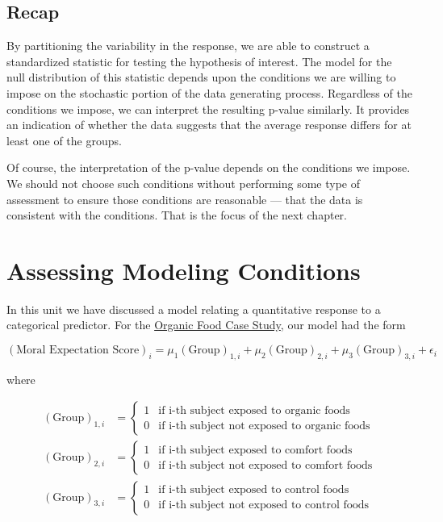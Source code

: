 \documentclass[
]{book}
\theoremstyle{plain}
\theoremstyle{mydefn}
\theoremstyle{myexmpl}
\theoremstyle{remark}
\begin{document}
\hypertarget{recap-2}{%
\section{Recap}\label{recap-2}}

By partitioning the variability in the response, we are able to construct a standardized statistic for testing the hypothesis of interest. The model for the null distribution of this statistic depends upon the conditions we are willing to impose on the stochastic portion of the data generating process. Regardless of the conditions we impose, we can interpret the resulting p-value similarly. It provides an indication of whether the data suggests that the average response differs for at least one of the groups.

Of course, the interpretation of the p-value depends on the conditions we impose. We should not choose such conditions without performing some type of assessment to ensure those conditions are reasonable --- that the data is consistent with the conditions. That is the focus of the next chapter.

\hypertarget{ANOVAassessment}{%
\chapter{Assessing Modeling Conditions}\label{ANOVAassessment}}

In this unit we have discussed a model relating a quantitative response to a categorical predictor. For the \protect\hyperlink{CaseOrganic}{Organic Food Case Study}, our model had the form

\[(\text{Moral Expectation Score})_i = \mu_1 (\text{Group})_{1,i} + \mu_2 (\text{Group})_{2,i} + \mu_3 (\text{Group})_{3,i} + \epsilon_i\]

where

\[
\begin{aligned}
  (\text{Group})_{1,i} &= \begin{cases}
    1 & \text{if i-th subject exposed to organic foods} \\
    0 & \text{if i-th subject not exposed to organic foods} 
    \end{cases} \\
  (\text{Group})_{2,i} &= \begin{cases}
    1 & \text{if i-th subject exposed to comfort foods} \\
    0 & \text{if i-th subject not exposed to comfort foods} 
    \end{cases} \\
  (\text{Group})_{3,i} &= \begin{cases}
    1 & \text{if i-th subject exposed to control foods} \\
    0 & \text{if i-th subject not exposed to control foods}
    \end{cases}
\end{aligned}
\]
\end{document}
